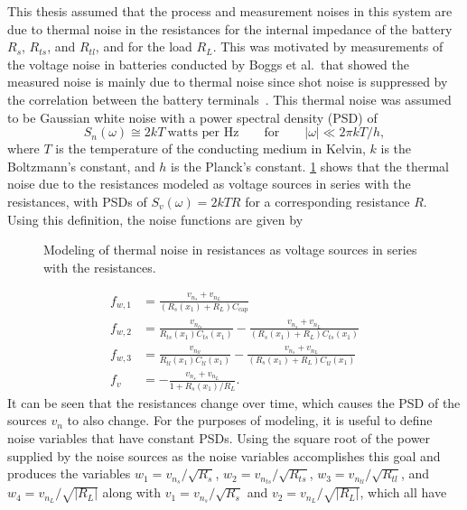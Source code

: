 \documentclass[../zhang_thesis.tex]{subfiles}
\begin{document}
This thesis assumed that the process and measurement noises in this system are due to thermal noise in the resistances for the internal impedance of the battery $R_s$, $R_{ts}$, and $R_{tl}$, and for the load $R_L$. This was motivated by measurements of the voltage noise in batteries conducted by Boggs et al.\ that showed the measured noise is mainly due to thermal noise since shot noise is suppressed by the correlation between the battery terminals~\cite{boggs95}. This thermal noise
was assumed to be Gaussian white noise with a power spectral density (PSD) of~\cite{stremler82}
\begin{equation}
    S_n(\omega) \cong 2kT\ \text{watts per Hz} \qquad \text{for} \qquad |\omega| \ll 2\pi kT/h,
\end{equation}
where $T$ is the temperature of the conducting medium in Kelvin, $k$ is the Boltzmann's constant, and $h$ is the Planck's constant. \cref{fig:batt_noisy} shows that the thermal noise due to the resistances modeled as voltage sources in series with the resistances, with PSDs of $S_v(\omega)=2kTR$ for a corresponding resistance $R$. Using this definition, the noise functions are given by
\begin{figure}[b]
\centering
%
\caption{Modeling of thermal noise in resistances as voltage sources in series with the resistances.}
\label{fig:batt_noisy}
\end{figure}
\begin{align}
    f_{w,1} &= \frac{v_{n_s}+v_{n_L}}{(R_s(x_1)+R_L)C_\text{cap}} \\
    f_{w,2} &= \frac{v_{n_{ts}}}{R_{ts}(x_1)C_{ts}(x_1)} - \frac{v_{n_s}+v_{n_L}}{(R_s(x_1)+R_L)C_{ts}(x_1)} \\
    f_{w,3} &= \frac{v_{n_{tl}}}{R_{tl}(x_1)C_{tl}(x_1)} - \frac{v_{n_s}+v_{n_L}}{(R_s(x_1)+R_L)C_{tl}(x_1)} \\
    f_v &= - \frac{v_{n_s}+v_{n_L}}{1+R_s(x_1)/R_L}.
\end{align}
It can be seen that the resistances change over time, which causes the PSD of the sources $v_n$ to also change. For the purposes of modeling, it is useful to define noise variables that have constant PSDs. Using the square root of the power supplied by the noise sources as the noise variables accomplishes this goal and produces the variables $w_1=v_{n_s}/\sqrt{R_s}$, $w_2=v_{n_{ts}}/\sqrt{R_{ts}}$, $w_3=v_{n_{tl}}/\sqrt{R_{tl}}$, and $w_4=v_{n_L}/\sqrt{|R_L|}$ along with
$v_1=v_{n_s}/\sqrt{R_s}$ and $v_2=v_{n_L}/\sqrt{|R_L|}$, which all have
\end{document}
